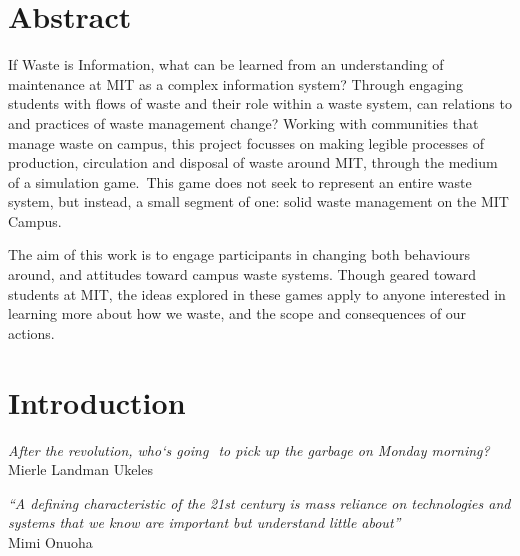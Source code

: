 \documentclass[nofonts,nols,justified,nobib]{tufte-book}
\begin{document}

\renewcommand{\thepage}{\roman{page}}



\newpage


\chapter*{Abstract}

If Waste is Information, what can be learned from an understanding of maintenance at MIT as a complex information system? Through engaging students with flows of waste and their role within a waste system, can relations to and practices of waste management change? Working with communities that manage waste on campus, this project focusses on making legible processes of production, circulation and disposal of waste around MIT, through the medium of a simulation game. This game does not seek to represent an entire waste system, but instead, a small segment of one: solid waste management on the MIT Campus.

The aim of this work is to engage participants in changing both behaviours around, and attitudes toward campus waste systems. Though geared toward students at MIT, the ideas explored in these games apply to anyone interested in learning more about how we waste, and the scope and consequences of our actions.

\tableofcontents


\newpage
\setcounter{page}{1}
\renewcommand{\thepage}{\arabic{page}}

\chapter*{Introduction}

\begin{flushright}
\begin{flushright}
\emph{After the revolution, who`s going  to pick up the garbage on Monday morning?} \cite{ukeles_manifesto_1969}\\
Mierle Landman Ukeles
\end{flushright}
\end{flushright}


\begin{flushright}
\emph{``A defining characteristic of the 21st century is mass reliance on technologies and systems that we know are important but understand little about''} \cite{onuoha_i_2016}\\
Mimi Onuoha
\end{flushright}
\end{document}
